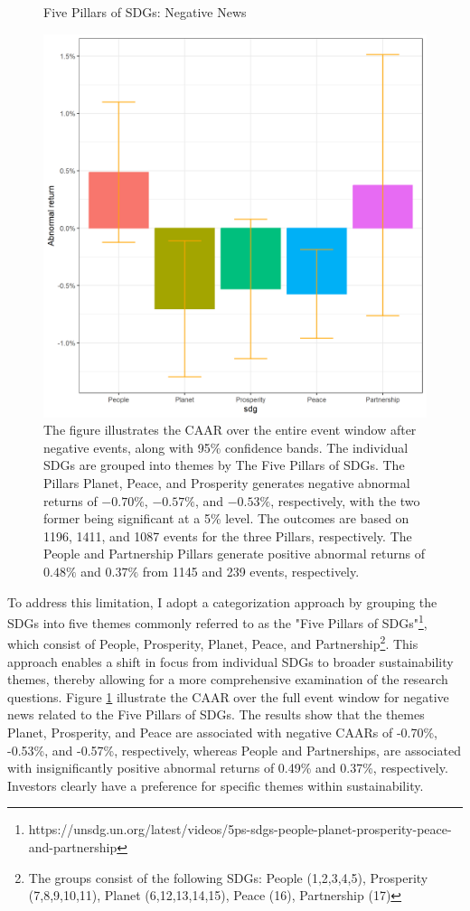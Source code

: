 \begin{figure} [h]
    \centering
    \caption{Five Pillars of SDGs: Negative News}
    \includegraphics[scale=0.6]{Projekt/1.Figures analysis/ST_negative_sdg_bar_groups_0.png}
    \caption*{\footnotesize The figure illustrates the CAAR over the entire event window after negative events, along with 95\% confidence bands. The individual SDGs are grouped into themes by The Five Pillars of SDGs. The Pillars Planet, Peace, and Prosperity generates negative abnormal returns of $-0.70\%$, $-0.57\%$, and $-0.53\%$, respectively, with the two former being significant at a 5\% level. The outcomes are based on 1196, 1411, and 1087 events for the three Pillars, respectively. The People and Partnership Pillars generate positive abnormal returns of $0.48\%$ and $0.37\%$ from 1145 and 239 events, respectively. 
    }
    \label{fig:ST_neg_bar}
\end{figure}

To address this limitation, I adopt a categorization approach by grouping the SDGs into five themes commonly referred to as the "Five Pillars of SDGs"\footnote{https://unsdg.un.org/latest/videos/5ps-sdgs-people-planet-prosperity-peace-and-partnership}, which consist of People, Prosperity, Planet, Peace, and Partnership\footnote{The groups consist of the following SDGs: People (1,2,3,4,5), Prosperity (7,8,9,10,11), Planet (6,12,13,14,15), Peace (16), Partnership (17)}.
This approach enables a shift in focus from individual SDGs to broader sustainability themes, thereby allowing for a more comprehensive examination of the research questions. Figure \ref{fig:ST_neg_bar} illustrate the CAAR over the full event window for negative news related to the Five Pillars of SDGs.
The results show that the themes Planet, Prosperity, and Peace are associated with negative CAARs of -0.70\%, -0.53\%, and -0.57\%, respectively, whereas People and Partnerships, are associated with insignificantly positive abnormal returns of 0.49\% and 0.37\%, respectively. Investors clearly have a preference for specific themes within sustainability. 

